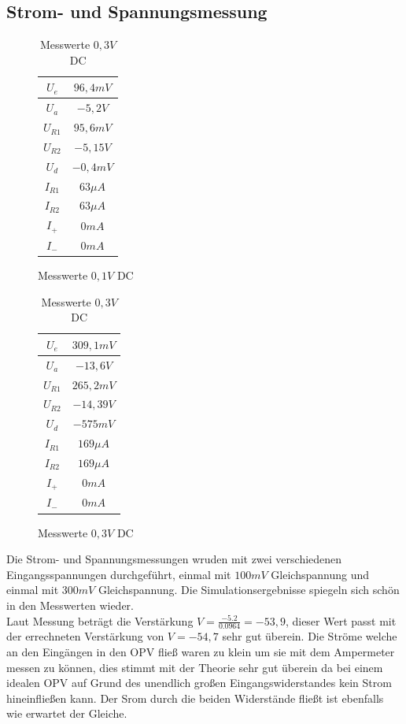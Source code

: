 \subsection{Strom- und Spannungsmessung}
\begin{table}[H]
\begin{minipage}{.5\textwidth}
\begin{figure}[H]
\centering
 \begin{tabular}{c|c}
  $U_e$ & $96,4mV$ \\ \hline
  $U_a$ & $-5,2V$ \\ \hline
  $U_{R1}$ & $95,6mV$ \\ \hline
  $U_{R2}$ & $-5,15V$ \\ \hline
  $U_d$ & $-0,4mV$ \\ \hline
  $I_{R1}$ & $63\mu A$ \\ \hline
  $I_{R2}$ & $63\mu A$ \\ \hline
  $I_+$ & $0mA$ \\ \hline
  $I_-$ & $0mA$ \\
 \end{tabular}
  \caption{Messwerte $0,1V$ DC}
\end{figure}
\end{minipage}
\begin{minipage}{.5\textwidth}
\begin{figure}[H]
  \centering
 \begin{tabular}{c|c}
  $U_e$ & $309,1mV$ \\ \hline
  $U_a$ & $-13,6V$ \\ \hline
  $U_{R1}$ & $265,2mV$ \\ \hline
  $U_{R2}$ & $-14,39V$ \\ \hline
  $U_d$ & $-575mV$ \\ \hline
  $I_{R1}$ & $169\mu A$ \\ \hline
  $I_{R2}$ & $169\mu A$ \\ \hline
  $I_+$ & $0mA$ \\ \hline
  $I_-$ & $0mA$ \\
 \end{tabular}
 \caption{Messwerte $0,3V$ DC}
\end{figure}
\end{minipage}
\end{table}
\noindent
Die Strom- und Spannungsmessungen wruden mit zwei verschiedenen Eingangsspannungen durchgef\"uhrt, einmal mit $100mV$ Gleichspannung und einmal mit $300mV$ Gleichspannung. Die Simulationsergebnisse spiegeln sich schön in den Messwerten wieder. \\
Laut Messung beträgt die Verstärkung $V=\frac{-5.2}{0.0964}=-53,9$, dieser Wert passt mit der errechneten Verst\"arkung von $V=-54,7$ sehr gut \"uberein. Die Str\"ome welche an den Eing\"angen in den OPV flie\ss{} waren zu klein um sie mit dem Ampermeter messen zu k\"onnen, dies stimmt mit der Theorie sehr gut \"uberein da bei einem idealen OPV auf Grund des unendlich großen Eingangswiderstandes kein Strom hineinflie\ss{}en kann. Der Srom durch die beiden Widerst\"ande fließt ist ebenfalls wie erwartet der Gleiche.


